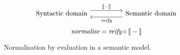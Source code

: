 \documentclass[../../../main.tex]{subfiles}
\begin{document}
\begin{figure}
\begin{equation*}
\begin{tikzcd}
  \text{Syntactic domain} \arrow[rr, "\text{\textlbrackdbl} - \text{\textrbrackdbl}", shift left=2] &  & \text{Semantic domain} \arrow[ll, "\textit{reify}", shift left=2]
\end{tikzcd}
\end{equation*}
\vspace{0.5ex}
\begin{equation*}
\textit{normalise} = \textit{reify} \circ \text{\textlbrackdbl} - \text{\textrbrackdbl}
\end{equation*}
\caption{Normalisation by evaluation in a semantic model.}
\label{fig:nbe}
\end{figure}
\end{document}
